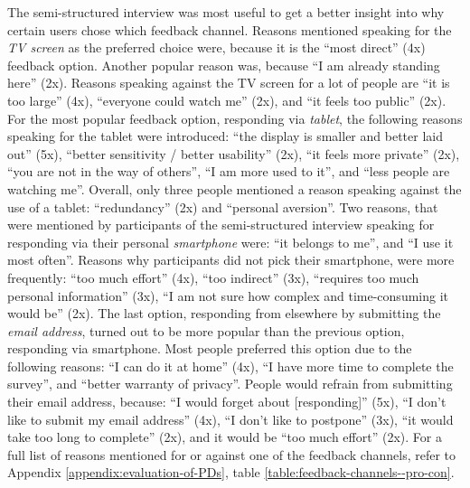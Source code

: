 	The semi-structured interview was most useful to get a better insight into why certain users chose which feedback channel. Reasons mentioned speaking for the \textit{TV screen} as the preferred choice were, because it is the ``most direct'' (4x) feedback option. Another popular reason was, because ``I am already standing here'' (2x). Reasons speaking against the TV screen for a lot of people are ``it is too large'' (4x), ``everyone could watch me'' (2x), and ``it feels too public'' (2x). 
	For the most popular feedback option, responding via \textit{tablet}, the following reasons speaking for the tablet were introduced: ``the display is smaller and better laid out'' (5x), ``better sensitivity / better usability'' (2x), ``it feels more private'' (2x), ``you are not in the way of others'', ``I am more used to it'', and ``less people are watching me''. Overall, only three people mentioned a reason speaking against the use of a tablet: ``redundancy'' (2x) and ``personal aversion''.
	Two reasons, that were mentioned by participants of the semi-structured interview speaking for responding via their personal \textit{smartphone} were: ``it belongs to me'', and ``I use it most often''. Reasons why participants did not pick their smartphone, were more frequently: ``too much effort'' (4x), ``too indirect'' (3x), ``requires too much personal information'' (3x), ``I am not sure how complex and time-consuming it would be'' (2x).
	The last option, responding from elsewhere by submitting the \textit{email address}, turned out to be more popular than the previous option, responding via smartphone. Most people preferred this option due to the following reasons: ``I can do it at home'' (4x), ``I have more time to complete the survey'', and ``better warranty of privacy''. People would refrain from submitting their email address, because: ``I would forget about [responding]'' (5x), ``I don't like to submit my email address'' (4x), ``I don't like to postpone'' (3x), ``it would take too long to complete'' (2x), and it would be ``too much effort'' (2x). 
	For a full list of reasons mentioned for or against one of the feedback channels, refer to Appendix \ref{appendix:evaluation-of-PDs}, table \ref{table:feedback-channels--pro-con}.

